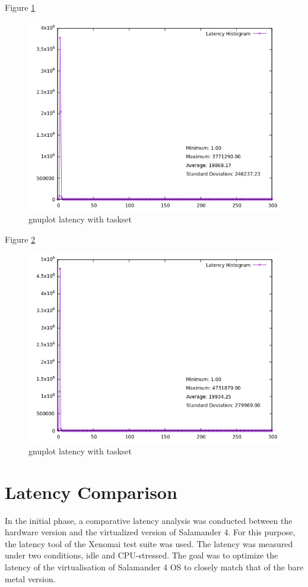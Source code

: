 \documentclass[MMR,Master,english]{twbook}
\begin{document}
Figure \ref{fig:gnuplot_max_latency_with_taskset}
\begin{figure}[H]
	\centering
	\includegraphics[width=0.8\columnwidth]{masterthesis-documentation/docs/sigmatek/xenomai/with_taskset/gnuplot_max_latency_with_taskset.png}
	\caption[gnuplot latency with taskset]{gnuplot latency with taskset}
	\label{fig:gnuplot_max_latency_with_taskset}
\end{figure}

Figure \ref{fig:gnuplot_max_latency_vapic}
\begin{figure}[H]
	\centering
	\includegraphics[width=0.8\columnwidth]{masterthesis-documentation/docs/sigmatek/xenomai/vapic/gnuplot_max_latency_vapic.png}
	\caption[gnuplot latency with taskset]{gnuplot latency with taskset}
	\label{fig:gnuplot_max_latency_vapic}
\end{figure}


\clearpage

\section{Latency Comparison}
In the initial phase, a comparative latency analysis was conducted between the hardware version and the virtualized version of Salamander 4. For this purpose, the latency tool of the Xenomai test suite was used. The latency was measured under two conditions, idle and CPU-stressed. The goal was to optimize the latency of the virtualisation of Salamander 4 OS to closely match that of the bare metal version.
\end{document}
